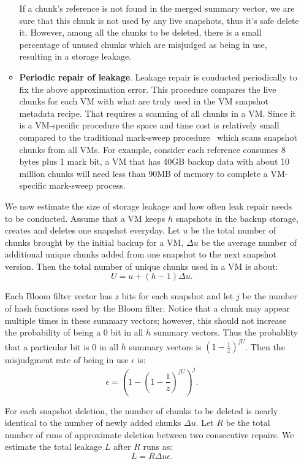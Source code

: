 \begin{itemize}
\begin{itemize}
If a chunk's reference is not found in the merged summary vector, we are sure that
this chunk is not used by any live snapshots, thus it's safe delete it. 
However, among all the chunks to be deleted, 
there is a small percentage of unused chunks  which
are misjudged as  being in use, resulting in a storage leakage.

\item {\bf Periodic repair of leakage}.
Leakage repair is conducted periodically to fix the above approximation error.
This procedure compares the live chunks for each VM with what are truly used in the VM snapshot metadata recipe.
That requires a scanning of all chunks in a VM. Since it is a VM-specific procedure 
the space and time cost is relatively small compared to the traditional mark-sweep procedure~\cite{Guo2011} which scans snapshot 
chunks from all VMs.
For example,
consider each reference consumes 8 bytes plus  1 mark bit, a VM that has 40GB backup data with about
10 million chunks will need less than 90MB of memory to complete a VM-specific mark-sweep process.
\end{itemize}

We now estimate the size of storage leakage and how often leak repair needs to be conducted.
Assume that  a VM keeps $h$ snapshots in the backup storage, creates and deletes one snapshot
everyday. Let $u$ be the total number of chunks brought by the initial backup for a VM, $\Delta u$ be the average
number of additional unique chunks added from one snapshot to the next snapshot version. Then the total number of unique
chunks used in a VM is about:
\[
U = u + (h-1)\Delta u.
\]

Each Bloom filter vector has  $z$ bits for each snapshot and let $j$ be the number of hash functions used by the
Bloom filter.  Notice that a chunk may appear multiple times in these summary vectors; however, this should not 
increase the probability of being a 0 bit in all $h$ summary vectors.
Thus the probablity that a particular bit is 0  in all $h$ summary vectors is  
$(1- \frac{1}{z}) ^{j U}$. 
Then the misjudgment rate of being in use $\epsilon$ is: 
\begin{equation}
\label{eq:falserate}
\epsilon = (1-(1-\frac{1}{z})^{jU})^j.
\end{equation}


For each snapshot deletion, the number of chunks to be deleted is nearly identical to the number of
newly added chunks $\Delta u$. 
Let $R$ be the total number of runs of approximate deletion between two consecutive 
repairs. We estimate  the total leakage $L$ after $R$ runs as:
\[
L = R \Delta u \epsilon.
\]


\end{itemize}
